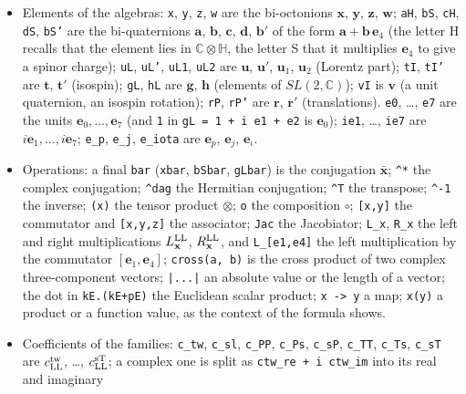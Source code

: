 \begin{itemize}
\item Elements of the algebras: \texttt{x}, \texttt{y}, \texttt{z}, \texttt{w} are the bi-octonions
$\mathbf x$, $\mathbf y$, $\mathbf z$, $\mathbf w$; \texttt{aH}, \texttt{bS}, \texttt{cH}, \texttt{dS},
\texttt{bS'} are the bi-quaternions $\mathbf a$, $\mathbf b$, $\mathbf c$, $\mathbf d$, $\mathbf b'$ of
the form $\mathbf a+\mathbf b\,\mathbf e_4$ (the letter H recalls that the element lies in $\mathbb
C\otimes\mathbb H$, the letter S that it multiplies $\mathbf e_4$ to give a spinor charge);
\texttt{uL}, \texttt{uL'}, \texttt{uL1}, \texttt{uL2} are $\mathbf u$, $\mathbf u'$, $\mathbf u_1$,
$\mathbf u_2$ (Lorentz part); \texttt{tI}, \texttt{tI'} are $\mathbf t$, $\mathbf t'$ (isospin);
\texttt{gL}, \texttt{hL} are $\mathbf g$, $\mathbf h$ (elements of $SL(2,\mathbb C)$); \texttt{vI} is
$\mathbf v$ (a unit quaternion, an isospin rotation); \texttt{rP}, \texttt{rP'} are $\mathbf r$,
$\mathbf r'$ (translations). \texttt{e0}, \dots, \texttt{e7} are the units $\mathbf e_0,\dots,\mathbf
e_7$ (and \texttt{1} in \texttt{gL = 1 + i e1 + e2} is $\mathbf e_0$); \texttt{ie1}, \dots, \texttt{ie7}
are $i\mathbf e_1,\dots,i\mathbf e_7$; \texttt{e\_p}, \texttt{e\_j}, \texttt{e\_iota} are $\mathbf e_p$,
$\mathbf e_j$, $\mathbf e_\iota$.
\item Operations: a final \texttt{bar} (\texttt{xbar}, \texttt{bSbar}, \texttt{gLbar}) is the
conjugation $\bar{\mathbf x}$; \texttt{\^{}*} the complex conjugation; \texttt{\^{}dag} the Hermitian
conjugation; \texttt{\^{}T} the transpose; \texttt{\^{}-1} the inverse; \texttt{(x)} the tensor product
$\otimes$; \texttt{o} the composition $\circ$; \texttt{[x,y]} the commutator and \texttt{[x,y,z]} the
associator; \texttt{Jac} the Jacobiator; \texttt{L\_x}, \texttt{R\_x} the left and right multiplications
$L^{\rm LL}_{\mathbf x}$, $R^{\rm LL}_{\mathbf x}$, and \texttt{L\_[e1,e4]} the left multiplication by the
commutator $[\mathbf e_1,\mathbf e_4]$; \texttt{cross(a, b)} is the cross product of two complex
three-component vectors; \texttt{|...|} an absolute value or the length of a vector; the dot in
\texttt{kE.(kE+pE)} the Euclidean scalar product; \texttt{x -> y} a map; \texttt{x(y)} a product
or a function value, as the context of the formula shows.
\item Coefficients of the families: \texttt{c\_tw}, \texttt{c\_sl}, \texttt{c\_PP}, \texttt{c\_Ps},
\texttt{c\_sP}, \texttt{c\_TT}, \texttt{c\_Ts}, \texttt{c\_sT} are $c^{\rm tw}_{\rm LL}$, \dots,
$c^{\rm sT}_{\rm LL}$; a complex one is split as \texttt{ctw\_re + i ctw\_im} into its real and imaginary

\end{itemize}
